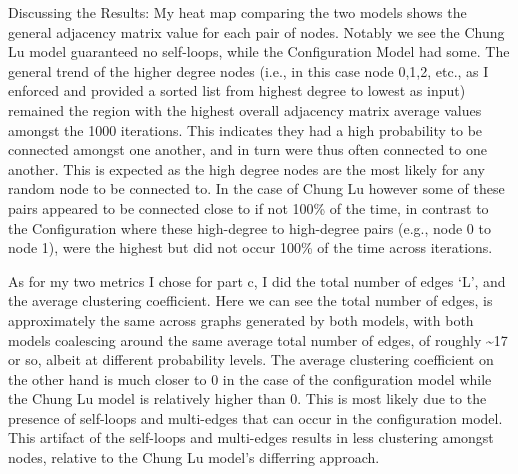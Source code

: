 \documentclass[11pt]{article}
\begin{document}
    Discussing the Results: My heat map comparing the two models shows the
general adjacency matrix value for each pair of nodes. Notably we see
the Chung Lu model guaranteed no self-loops, while the Configuration
Model had some. The general trend of the higher degree nodes (i.e., in
this case node 0,1,2, etc., as I enforced and provided a sorted list from
highest degree to lowest as input) remained the region with the highest
overall adjacency matrix average values amongst the 1000 iterations.
This indicates they had a high probability to be connected amongst one
another, and in turn were thus often connected to one another. This is
expected as the high degree nodes are the most likely for any random
node to be connected to. In the case of Chung Lu however some of these
pairs appeared to be connected close to if not 100\% of the time, in
contrast to the Configuration where these high-degree to high-degree
pairs (e.g., node 0 to node 1), were the highest but did not occur 100\%
of the time across iterations.

As for my two metrics I chose for part c, I did the total number of
edges `L', and the average clustering coefficient. Here we can see the
total number of edges, is approximately the same across graphs generated
by both models, with both models coalescing around the same average
total number of edges, of roughly \textasciitilde17 or so, albeit at
different probability levels. The average clustering coefficient on the
other hand is much closer to 0 in the case of the configuration model
while the Chung Lu model is relatively higher than 0. This is most
likely due to the presence of self-loops and multi-edges that can occur
in the configuration model. This artifact of the self-loops and
multi-edges results in less clustering amongst nodes, relative to the
Chung Lu model's differring approach.
\end{document}
